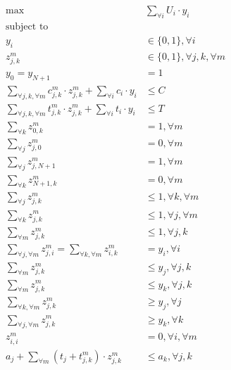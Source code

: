 \begin{figure}[t]
\begin{align}
	\label{eq:max}
	\max \quad & \sum_{\forall i} U_{{i}} \cdot y_{i} \\
	\text{subject to } \quad & \nonumber \\
	\label{eq:y}
	y_{i} & \in \{ 0, 1 \}, \forall i \\
	\label{eq:z}
	z^m_{j,k} & \in \{ 0, 1 \}, \forall j,k, \forall m \\
	\label{eq:sd}
	y_{0} = y_{{N+1}} & = 1 \\
	\label{eq:cost}
	\sum_{\forall j, k, \forall m} c^{m}_{{j},{k}} \cdot z^m_{j,k} + \sum_{\forall i} c_{i} \cdot y_{i} & \leq C \\
	\label{eq:time}
	\sum_{\forall j, k, \forall m} t^{m}_{{j},{k}} \cdot z^m_{j,k} + \sum_{\forall i} t_{i} \cdot y_{i} & \leq T \\
	\label{eq:sout}
	\sum_{\forall k} z^m_{{0},{k}} & = 1, \forall m \\
	\label{eq:sin}
	\sum_{\forall j} z^m_{{j},{0}} & = 0, \forall m \\
	\label{eq:din}
	\sum_{\forall j} z^m_{{j},{N+1}} & = 1, \forall m \\
	\label{eq:dout}
	\sum_{\forall k} z^m_{{N+1},{k}} & = 0, \forall m \\
	\label{eq:out}
	\sum_{\forall j} z^m_{{j},{k}} & \leq 1, \forall k, \forall m \\
	\label{eq:in}
	\sum_{\forall k} z^m_{{j},{k}} & \leq 1, \forall j, \forall m \\
	\label{eq:mode}
	\sum_{\forall m} z^m_{{j},{k}} & \leq 1, \forall j, k \\
	\label{eq:connectivity}
	\sum_{\forall j, \forall m} z^m_{{j},{i}} = \sum_{\forall k, \forall m} z^m_{{i},{k}} & = y_i, \forall i \\
	\label{eq:nodechosen1}
	\sum_{\forall m} z^m_{{j},{k}} & \leq y_j, \forall j,k \\
	\label{eq:nodechosen2}
	\sum_{\forall m} z^m_{{j},{k}} & \leq y_k, \forall j,k \\
	\label{eq:edgechosen1}
	\sum_{\forall k, \forall m} z^m_{{j},{k}} & \geq y_j, \forall j \\
	\label{eq:edgechosen2}
    \sum_{\forall j, \forall m} z^m_{{j},{k}} & \geq y_k, \forall k \\
	\label{eq:self}
	z^m_{{i},{i}} & = 0, \forall i, \forall m  \\
	\label{eq:subtour}
	a_j + \sum_{\forall m}(t_{j} + t^{m}_{j,k}) \cdot z^{m}_{j,k} & \leq a_k, \forall j,k
\end{align}
\label{fig:basic}
\end{figure}

